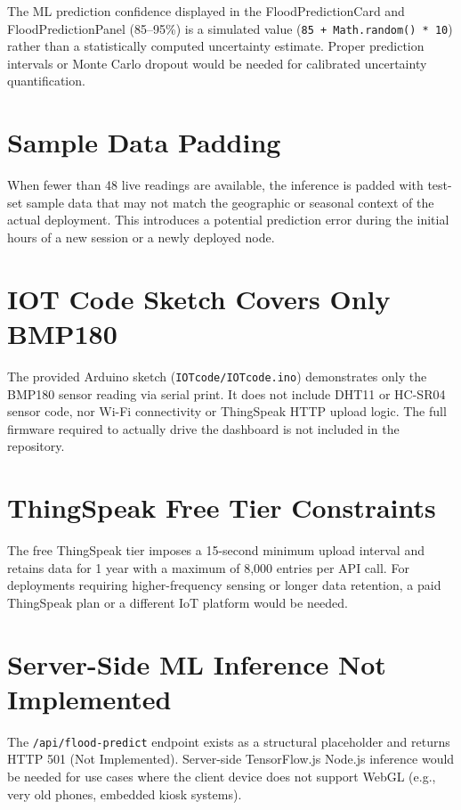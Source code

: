 The ML prediction confidence displayed in the FloodPredictionCard and FloodPredictionPanel (85--95\%) is a simulated value (\texttt{85 + Math.\allowbreak{}random() * 10}) rather than a statistically computed uncertainty estimate. Proper prediction intervals or Monte Carlo dropout would be needed for calibrated uncertainty quantification.

\section{Sample Data Padding}

When fewer than 48 live readings are available, the inference is padded with test-set sample data that may not match the geographic or seasonal context of the actual deployment. This introduces a potential prediction error during the initial hours of a new session or a newly deployed node.

\section{IOT Code Sketch Covers Only BMP180}

The provided Arduino sketch (\texttt{IOTcode/\allowbreak{}IOTcode.\allowbreak{}ino}) demonstrates only the BMP180 sensor reading via serial print. It does not include DHT11 or HC-SR04 sensor code, nor Wi-Fi connectivity or ThingSpeak HTTP upload logic. The full firmware required to actually drive the dashboard is not included in the repository.

\section{ThingSpeak Free Tier Constraints}

The free ThingSpeak tier imposes a 15-second minimum upload interval and retains data for 1 year with a maximum of 8,000 entries per API call. For deployments requiring higher-frequency sensing or longer data retention, a paid ThingSpeak plan or a different IoT platform would be needed.

\section{Server-Side ML Inference Not Implemented}

The \texttt{/\allowbreak{}api/\allowbreak{}flood-predict} endpoint exists as a structural placeholder and returns HTTP 501 (Not Implemented). Server-side TensorFlow.js Node.js inference would be needed for use cases where the client device does not support WebGL (e.g., very old phones, embedded kiosk systems).

